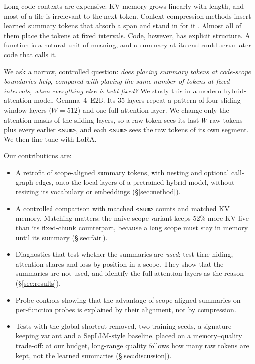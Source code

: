 \documentclass[10pt,twocolumn]{article}
\makeatletter
\renewcommand{\section}{\@startsection{section}{1}{\z@}{12pt}{4pt}{\normalfont\normalsize\bfseries\MakeUppercase}}
\newcommand{\sumtok}{\texttt{<sum>}}
\makeatother
\begin{document}
\section{Introduction}

Long code contexts are expensive: KV memory grows linearly with length, and
most of a file is irrelevant to the next token. Context-compression methods
insert learned summary tokens that absorb a span and stand in for it
\citep{mu2023gist,chevalier2023autocompressor,ge2023icae,zhang2024beacon}.
Almost all of them place the tokens at fixed intervals. Code, however, has
explicit structure. A function is a natural unit of meaning, and a summary at
its end could serve later code that calls it.

We ask a narrow, controlled question: \emph{does placing summary tokens at
code-scope boundaries help, compared with placing the same number of tokens
at fixed intervals, when everything else is held fixed?} We study this in a
modern hybrid-attention model, Gemma~4~E2B. Its 35 layers repeat a pattern of
four sliding-window layers ($W=512$) and one full-attention layer. We change
only the attention masks of the sliding layers, so a raw token sees its last
$W$ raw tokens plus every earlier \sumtok{}, and each \sumtok{} sees the raw
tokens of its own segment. We then fine-tune with LoRA.

Our contributions are:
\begin{itemize}
\item A retrofit of scope-aligned summary tokens, with nesting and optional
  call-graph edges, onto the local layers of a pretrained hybrid model,
  without resizing its vocabulary or embeddings (\S\ref{sec:method}).
\item A controlled comparison with matched \sumtok{} counts and matched KV
  memory. Matching matters: the naive scope variant keeps 52\% more KV live
  than its fixed-chunk counterpart, because a long scope must stay in memory
  until its summary (\S\ref{sec:fair}).
\item Diagnostics that test whether the summaries are \emph{used}: test-time
  hiding, attention shares and loss by position in a scope. They show that
  the summaries are not used, and identify the full-attention layers as the
  reason (\S\ref{sec:results}).
\item Probe controls showing that the advantage of scope-aligned summaries on
  per-function probes is explained by their alignment, not by compression.
\item Tests with the global shortcut removed, two training seeds, a
  signature-keeping variant and a SepLLM-style baseline, placed on a
  memory--quality trade-off: at our budget, long-range quality follows how
  many raw tokens are kept, not the learned summaries (\S\ref{sec:discussion}).
\end{itemize}
\end{document}
